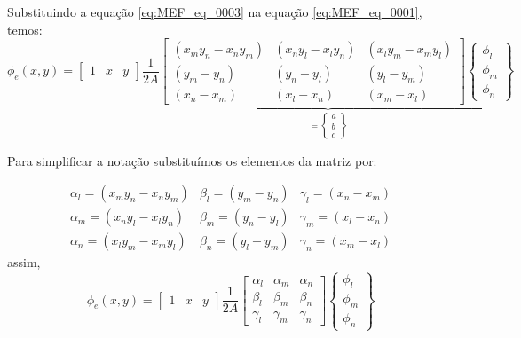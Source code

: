 \documentclass[
12pt,
a4paper,
oneside,
chapter=TITLE,
sumario=tradicional
]{abntex2}
\begin{document}
    
    Substituindo a equação \ref{eq:MEF_eq_0003} na equação \ref{eq:MEF_eq_0001}, temos:
    \begin{equation}
    \phi_e(x,y) =
    \begin{bmatrix}
    	1 & x & y
    \end{bmatrix}
    \underbrace{
    	\frac{1}{2A}
    	\begin{bmatrix}
    		(x_m y_n - x_n y_m) & (x_n y_l - x_l y_n) & (x_l y_m - x_m y_l) \\
    		(y_m - y_n) & (y_n - y_l) & (y_l - y_m) \\
    		(x_n - x_m) & (x_l - x_n) & (x_m - x_l)
    	\end{bmatrix}
    	\begin{Bmatrix}
    		\phi_{l} \\
    		\phi_{m} \\
    		\phi_{n}
    \end{Bmatrix}}_{= \begin{Bmatrix} a \\b\\c\end{Bmatrix}}
    \end{equation}
    
    
    Para simplificar a notação substituímos os elementos da matriz por:
    
    \begin{equation*}
    	\begin{array}{ccc}
    		\alpha_l = (x_m y_n - x_n y_m) &
    		\beta_l = (y_m - y_n) &
    		\gamma_l = (x_n - x_m) \\[6pt]
    		
    		\alpha_m  = (x_n y_l - x_l y_n) &
    		\beta_m = (y_n - y_l) &
    		\gamma_m = (x_l - x_n) \\[6pt]
    		
    		\alpha_n = (x_l y_m - x_m y_l) &
    		\beta_n = (y_l - y_m) &
    		\gamma_n = (x_m - x_l)
    	\end{array}
    \end{equation*}
    assim,
    \begin{equation*}
   	\phi_e(x,y) =
   	\begin{bmatrix}
   		1 & x & y
   	\end{bmatrix}    	
  	\frac{1}{2A}
  	\begin{bmatrix}
	\alpha_l &\alpha_m & \alpha_n \\
	\beta_l & \beta_m & \beta_n \\
	\gamma_l & \gamma_m & \gamma_n
  	\end{bmatrix}
	\begin{Bmatrix}
		\phi_{l} \\
		\phi_{m} \\
		\phi_{n}
	\end{Bmatrix}
    \end{equation*}
    
\end{document}
